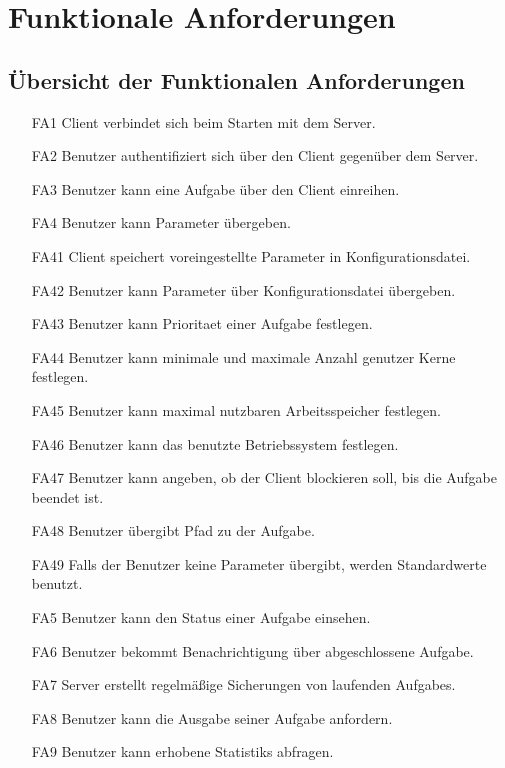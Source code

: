 \documentclass[a4paper,12pt]{article}
\begin{document}
\newpage

\section{Funktionale Anforderungen}

\subsection{Übersicht der  Funktionalen Anforderungen}

\begin{itemize}[nosep]
\leftskip=0.5cm

\item[FA1]	\gls{Client} verbindet sich beim Starten mit dem \gls{Server}.
\item[FA2] \gls{Benutzer} authentifiziert sich über den \gls{Client} gegenüber dem \gls{Server}.
\item[FA3] \gls{Benutzer} kann eine \gls{Aufgabe} über den \gls{Client} einreihen.
\item[FA4] \gls{Benutzer} kann \gls{Parameter} übergeben.
\item[FA41]	\gls{Client} speichert voreingestellte \gls{Parameter} in \gls{Konfigurationsdatei}.
\item[FA42]	\gls{Benutzer} kann \gls{Parameter} über \gls{Konfigurationsdatei} übergeben.
\item[FA43] \gls{Benutzer} kann \gls{Prioritaet} einer \gls{Aufgabe} festlegen.
\item[FA44] \gls{Benutzer} kann minimale und maximale Anzahl genutzer Kerne festlegen.
\item[FA45] \gls{Benutzer} kann maximal nutzbaren Arbeitsspeicher festlegen.
\item[FA46] \gls{Benutzer} kann das benutzte Betriebssystem festlegen.
\item[FA47] \gls{Benutzer} kann angeben, ob der \gls{Client} blockieren soll, bis die \gls{Aufgabe} beendet ist.
\item[FA48] \gls{Benutzer} übergibt Pfad zu der \gls{Aufgabe}.
\item[FA49] Falls der \gls{Benutzer} keine \gls{Parameter} übergibt, werden Standardwerte benutzt.
\item[FA5] \gls{Benutzer} kann den Status einer \gls{Aufgabe} einsehen.
\item[FA6] \gls{Benutzer} bekommt Benachrichtigung über abgeschlossene \gls{Aufgabe}.
\item[FA7] \gls{Server} erstellt regelmäßige Sicherungen von laufenden \glspl{Aufgabe}.
\item[FA8] \gls{Benutzer} kann die Ausgabe seiner \gls{Aufgabe} anfordern.
\item[FA9] \gls{Benutzer} kann erhobene \glspl{Statistik} abfragen.
\end{itemize}
\newpage
\end{document}
